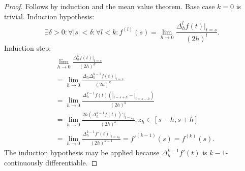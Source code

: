 \documentclass[a4paper,12pt]{article}
\begin{document}
\begin{proof}
    Follows by induction and the mean value theorem. Base case $k=0$ is trivial.
    Induction hypothesis:
    \begin{equation}
        \exists \delta>0: \forall |s|<\delta: \forall l<k: f^{(l)}(s) = \lim_{h \to 0} \frac{\Delta^{l}_{h} f(t)|_{t=s}}{(2h)^{l}}
        .
    \end{equation}
    Induction step:
    \begin{align}
         & \lim_{h \to 0} \frac{\Delta^{k}_{h} f(t)|_{t=s}}{(2h)^{k}}                                         \\
         & = \lim_{h \to 0} \frac{\Delta_{h}\Delta^{k-1}_{h} f(t)|_{t=s}}{(2h)^{k}}                           \\
         & = \lim_{h \to 0} \frac{\Delta^{k-1}_{h} f(t)(|_{t=s+h}-|_{t=s-h})}{(2h)^{k}}                       \\
         & = \lim_{h \to 0} \frac{2h (\Delta^{k-1}_{h} f(t))'|_{t=z_{h}}}{(2h)^{k}}, z_{h} \in[s-h,s+h]       \\
         & = \lim_{h \to 0} \frac{\Delta^{k-1}_{h} f'(t)|_{t=z_{h}}}{(2h)^{k-1}} = f'^{(k-1)}(s) = f^{(k)}(s)
        .
    \end{align}
    The induction hypothesis may be applied because $\Delta^{k-1}_{h} f'(t)$ is $k-1$-continuously differentiable.

\end{proof}
\end{document}
